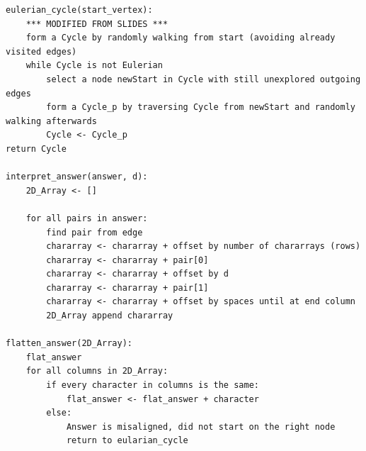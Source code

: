 \documentclass{article}
\begin{document}
\begin{lstlisting}
eulerian_cycle(start_vertex):
	*** MODIFIED FROM SLIDES ***
	form a Cycle by randomly walking from start (avoiding already visited edges)
	while Cycle is not Eulerian
		select a node newStart in Cycle with still unexplored outgoing edges   
		form a Cycle_p by traversing Cycle from newStart and randomly walking afterwards  
		Cycle <- Cycle_p 
return Cycle

interpret_answer(answer, d):
	2D_Array <- []

	for all pairs in answer:
		find pair from edge
		chararray <- chararray + offset by number of chararrays (rows)
		chararray <- chararray + pair[0]
		chararray <- chararray + offset by d
		chararray <- chararray + pair[1]
		chararray <- chararray + offset by spaces until at end column
		2D_Array append chararray
		
flatten_answer(2D_Array):
	flat_answer
	for all columns in 2D_Array:
		if every character in columns is the same:
			flat_answer <- flat_answer + character
		else:
			Answer is misaligned, did not start on the right node
			return to eularian_cycle
		
\end{lstlisting}

\pagebreak
\end{document}
